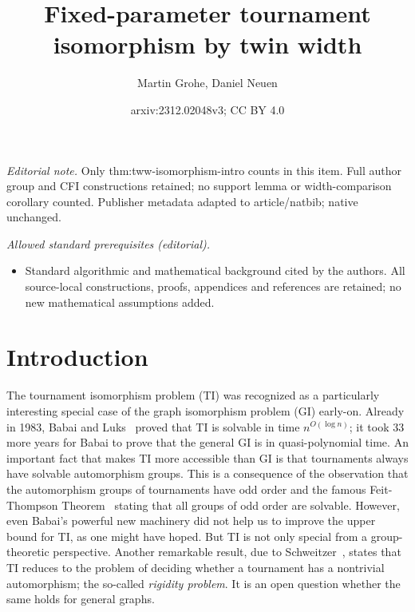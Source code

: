 \PassOptionsToPackage{dvipsnames,svgnames}{xcolor}\documentclass[10pt,a4paper]{article}
\title{Fixed-parameter tournament isomorphism by twin width}
\author{Martin Grohe, Daniel Neuen}
\date{arxiv:2312.02048v3; CC BY 4.0}
\begin{document}
\maketitle
\noindent\textit{Editorial note.} Only thm:tww-isomorphism-intro counts in this item. Full author group and CFI constructions retained; no support lemma or width-comparison corollary counted. Publisher metadata adapted to article/natbib; native unchanged.\par\medskip
\noindent\textit{Allowed standard prerequisites (editorial).}\begin{itemize}
\item Standard algorithmic and mathematical background cited by the authors. All source-local constructions, proofs, appendices and references are retained; no new mathematical assumptions added.
\end{itemize}\medskip
\section{Introduction}

The tournament isomorphism problem (TI) was recognized as a particularly interesting special case of the graph isomorphism problem (GI) early-on.
Already in 1983, Babai and Luks~\cite{BabaiL83} proved that TI is solvable in time $n^{O(\log n)}$;
it took 33 more years for Babai \cite{Babai16} to prove that the general GI is in quasi-polynomial time.
An important fact that makes TI more accessible than GI is that tournaments always have solvable automorphism groups.
This is a consequence of the observation that the automorphism groups of tournaments have odd order and the famous Feit-Thompson Theorem~\cite{FeitT63} stating that all groups of odd order are solvable.
However, even Babai's powerful new machinery did not help us to improve the upper bound for TI, as one might have hoped.
But TI is not only special from a group-theoretic perspective.
Another remarkable result, due to Schweitzer~\cite{Schweitzer17}, states that TI reduces to the problem of deciding whether a tournament has a nontrivial automorphism; the so-called \emph{rigidity problem}.
It is an open question whether the same holds for general graphs.
\end{document}
